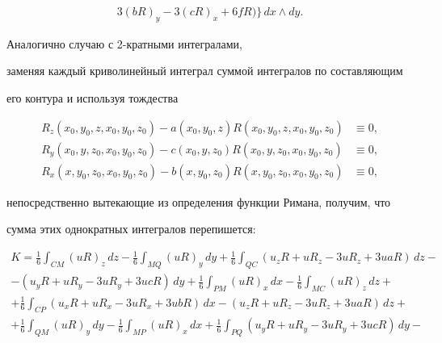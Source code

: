 \begin{pf}
\begin{gather*}
3(bR)_{y}-3(cR)_{x}+6fR)\Bigr \} \,dx\wedge dy.


\end{gather*}





Аналогично случаю с 2-кратными интегралами,


заменяя каждый криволинейный интеграл суммой интегралов по составляющим


его контура и используя тождества


\begin{align*}


R_{z}(x_{0},y_{0},z,x_{0},y_{0},z_{0})- a(x_{0},y_{0},z)R(x_{0},y_{0},z,x_{0},y_{0},z_{0})&\equiv 0,\\


R_{y}(x_{0},y,z_{0},x_{0},y_{0},z_{0})- c(x_{0},y,z_{0})R(x_{0},y,z_{0},x_{0},y_{0},z_{0})&\equiv 0,\\


R_{x}(x,y_{0},z_{0},x_{0},y_{0},z_{0})- b(x,y_{0},z_{0})R(x,y_{0},z_{0},x_{0},y_{0},z_{0})&\equiv 0,


\end{align*}


непосредственно вытекающие из определения функции Римана, получим, что


сумма этих однократных интегралов перепишется:


\begin{gather*}


K=\frac{1}{6} \int_{CM} (uR)_{z}\, dz-\frac{1}{6} \int_{MQ}


(uR)_{y}\, dy+\frac{1}{6} \int_{QC} (u_{z}R+uR_{z}-3uR_{z}+3uaR)\, dz-\\


%


-(u_{y}R+uR_{y}-3uR_{y}+3ucR)\, dy+\frac{1}{6} \int_{PM} (uR)_{x}\,dx


-\frac{1}{6} \int_{MC} (uR)_{z}\, dz+\\


%


+\frac{1}{6} \int_{CP}(u_{x}R+uR_{x}-


3uR_{x}+3ubR)\, dx-(u_{z}R+uR_{z}-3uR_{z}+3uaR)\,dz+\\


%


+\frac{1}{6} \int_{QM} (uR)_{y}\, dy-\frac{1}{6} \int_{MP}


(uR)_{x}\, dx+\frac{1}{6} \int_{PQ} (u_{y}R+uR_{y}-3uR_{y}+3ucR)\, dy-\\



\end{gather*}
\end{pf}

